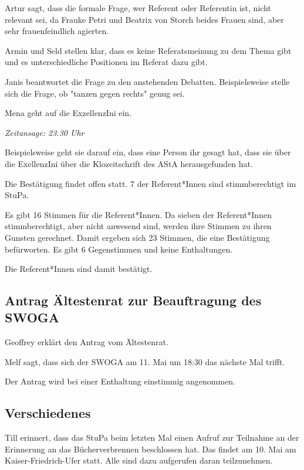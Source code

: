 \documentclass[ngerman,headheight=70pt]{scrartcl}
\begin{document}
    Artur sagt, dass die formale Frage, wer Referent oder Referentin ist,
    nicht relevant sei, da Frauke Petri und Beatrix von Storch beides Frauen sind,
    aber sehr frauenfeindlich agierten.

    Armin und Seld stellen klar, dass es keine Referatsmeinung zu dem
    Thema gibt und es unterschiedliche Positionen im Referat dazu gibt.

    Janis beantwortet die Frage zu den anstehenden Debatten. Beispielsweise
    stelle sich die Frage, ob "tanzen gegen rechts" genug sei.

    Mena geht auf die ExzellenzIni ein.

    \textit{Zeitansage: 23.30 Uhr}

    Beispielsweise geht sie darauf ein, dass eine Person ihr gesagt hat, dass
    sie über die ExellenzIni über die Klozeitschrift des AStA herausgefunden hat.

    Die Bestätigung findet offen statt. 7 der Referent*Innen sind stimmberechtigt
    im StuPa.

    Es gibt 16 Stimmen für die Referent*Innen. Da sieben der Referent*Innen
    stimmberechtigt, aber nicht anwesend sind, werden ihre Stimmen zu ihren
    Gunsten gerechnet. Damit ergeben sich 23 Stimmen, die eine Bestätigung
    befürworten. Es gibt 6 Gegenstimmen und keine Enthaltungen.

    Die Referent*Innen sind damit bestätigt.

    \subsection{Antrag Ältestenrat zur Beauftragung des SWOGA}

    Geoffrey erklärt den Antrag vom Ältestenrat.

    Melf sagt, dass sich der SWOGA am 11. Mai um 18:30 das nächste Mal
    trifft.

    Der Antrag wird bei einer Enthaltung einstimmig angenommen.

    \subsection{Verschiedenes}

    Till erinnert, dass das StuPa beim letzten Mal einen Aufruf zur Teilnahme
    an der Erinnerung an das Bücherverbrennen beschlossen hat. Das findet am
    10. Mai am Kaiser-Friedrich-Ufer statt. Alle sind dazu aufgerufen daran
    teilzunehmen.
\end{document}
